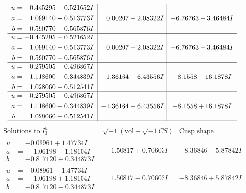 \documentclass[1p]{elsarticle_modified}
\theoremstyle{definition}
\newcommand{\I}{\sqrt{-1}}
\begin{document}
$$\begin{array}{c|c|c}
\begin{aligned}
u &= -0.445295 + 0.521652 I \\
a &= \phantom{-}1.099140 + 0.513773 I \\
b &= \phantom{-}0.590770 + 0.565876 I\end{aligned}
 & \phantom{-}0.00207 + 2.08322 I & -6.76763 - 3.46484 I \\ \hline\begin{aligned}
u &= -0.445295 - 0.521652 I \\
a &= \phantom{-}1.099140 - 0.513773 I \\
b &= \phantom{-}0.590770 - 0.565876 I\end{aligned}
 & \phantom{-}0.00207 - 2.08322 I & -6.76763 + 3.46484 I \\ \hline\begin{aligned}
u &= -0.279505 + 0.496867 I \\
a &= \phantom{-}1.118600 - 0.344839 I \\
b &= \phantom{-}1.028060 - 0.512541 I\end{aligned}
 & -1.36164 + 6.43556 I & -8.1558 - 16.1878 I \\ \hline\begin{aligned}
u &= -0.279505 - 0.496867 I \\
a &= \phantom{-}1.118600 + 0.344839 I \\
b &= \phantom{-}1.028060 + 0.512541 I\end{aligned}
 & -1.36164 - 6.43556 I & -8.1558 + 16.1878 I\\
 \hline 
 \end{array}$$\newpage$$\begin{array}{c|c|c}  
\text{Solutions to }I^u_{3}& \I (\text{vol} + \sqrt{-1}CS) & \text{Cusp shape}\\
 \hline 
\begin{aligned}
u &= -0.08961 + 1.47734 I \\
a &= \phantom{-}1.06198 - 1.18104 I \\
b &= -0.817120 + 0.344873 I\end{aligned}
 & \phantom{-}1.50817 + 0.70603 I & -8.36846 - 5.87842 I \\ \hline\begin{aligned}
u &= -0.08961 - 1.47734 I \\
a &= \phantom{-}1.06198 + 1.18104 I \\
b &= -0.817120 - 0.344873 I\end{aligned}
 & \phantom{-}1.50817 - 0.70603 I & -8.36846 + 5.87842 I \\ \hline\begin{aligned}

\end{aligned}
\end{array}$$
\end{document}
